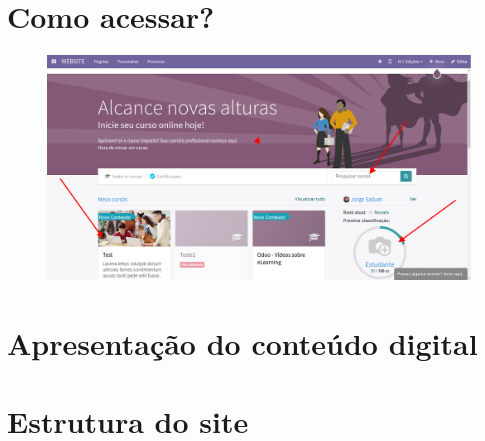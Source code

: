 
\section{Como acessar?}


\lipsum[1-3]
\begin{figure}[t]
\includegraphics[width=\textwidth]{imgs/screenshot2}
\end{figure}

\section{Apresentação do conteúdo digital}


\lipsum[1-3]

\section{Estrutura do site} %




